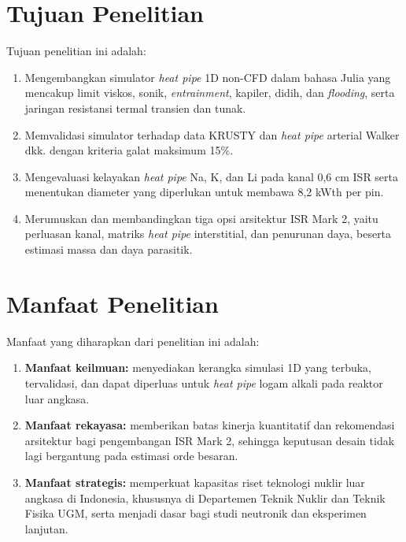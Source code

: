 \documentclass[
  indonesian,
  12pt,
  a4paper,
]{report}
\providecommand{\tightlist}{%
  \setlength{\itemsep}{0pt}\setlength{\parskip}{0pt}}
\begin{document}
\section{Tujuan Penelitian}\label{tujuan-penelitian}

Tujuan penelitian ini adalah:

\begin{enumerate}
\def\labelenumi{\arabic{enumi}.}
\tightlist
\item
  Mengembangkan simulator \emph{heat pipe} 1D non-CFD dalam bahasa Julia
  yang mencakup limit viskos, sonik, \emph{entrainment}, kapiler, didih,
  dan \emph{flooding}, serta jaringan resistansi termal transien dan
  tunak.
\item
  Memvalidasi simulator terhadap data KRUSTY dan \emph{heat pipe}
  arterial Walker dkk. dengan kriteria galat maksimum 15\%.
\item
  Mengevaluasi kelayakan \emph{heat pipe} Na, K, dan Li pada kanal 0,6
  cm ISR serta menentukan diameter yang diperlukan untuk membawa 8,2
  kWth per pin.
\item
  Merumuskan dan membandingkan tiga opsi arsitektur ISR Mark 2, yaitu
  perluasan kanal, matriks \emph{heat pipe} interstitial, dan penurunan
  daya, beserta estimasi massa dan daya parasitik.
\end{enumerate}

\section{Manfaat Penelitian}\label{manfaat-penelitian}

Manfaat yang diharapkan dari penelitian ini adalah:

\begin{enumerate}
\def\labelenumi{\arabic{enumi}.}
\tightlist
\item
  \textbf{Manfaat keilmuan:} menyediakan kerangka simulasi 1D yang
  terbuka, tervalidasi, dan dapat diperluas untuk \emph{heat pipe} logam
  alkali pada reaktor luar angkasa.
\item
  \textbf{Manfaat rekayasa:} memberikan batas kinerja kuantitatif dan
  rekomendasi arsitektur bagi pengembangan ISR Mark 2, sehingga
  keputusan desain tidak lagi bergantung pada estimasi orde besaran.
\item
  \textbf{Manfaat strategis:} memperkuat kapasitas riset teknologi
  nuklir luar angkasa di Indonesia, khususnya di Departemen Teknik
  Nuklir dan Teknik Fisika UGM, serta menjadi dasar bagi studi neutronik
  dan eksperimen lanjutan.
\end{enumerate}
\end{document}
